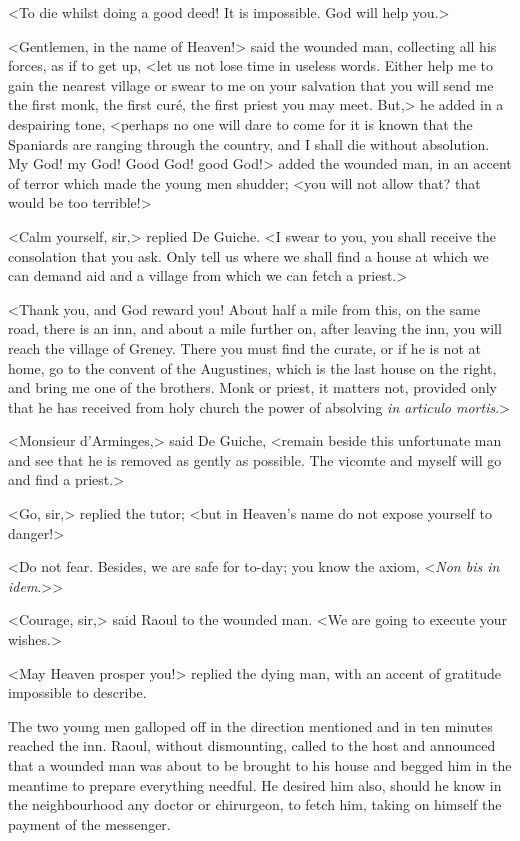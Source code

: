 <To die whilst doing a good deed! It is impossible. God will help you.>

<Gentlemen, in the name of Heaven!> said the wounded man, collecting all his forces, as if to get up, <let us not lose time in useless words. Either help me to gain the nearest village or swear to me on your salvation that you will send me the first monk, the first curé, the first priest you may meet. But,> he added in a despairing tone, <perhaps no one will dare to come for it is known that the Spaniards are ranging through the country, and I shall die without absolution. My God! my God! Good God! good God!> added the wounded man, in an accent of terror which made the young men shudder; <you will not allow that? that would be too terrible!>

<Calm yourself, sir,> replied De Guiche. <I swear to you, you shall receive the consolation that you ask. Only tell us where we shall find a house at which we can demand aid and a village from which we can fetch a priest.>

<Thank you, and God reward you! About half a mile from this, on the same road, there is an inn, and about a mile further on, after leaving the inn, you will reach the village of Greney. There you must find the curate, or if he is not at home, go to the convent of the Augustines, which is the last house on the right, and bring me one of the brothers. Monk or priest, it matters not, provided only that he has received from holy church the power of absolving \textit{in articulo mortis}.>

<Monsieur d'Arminges,> said De Guiche, <remain beside this unfortunate man and see that he is removed as gently as possible. The vicomte and myself will go and find a priest.>

<Go, sir,> replied the tutor; <but in Heaven's name do not expose yourself to danger!>

<Do not fear. Besides, we are safe for to-day; you know the axiom, <\textit{Non bis in idem}.>>

<Courage, sir,> said Raoul to the wounded man. <We are going to execute your wishes.>

<May Heaven prosper you!> replied the dying man, with an accent of gratitude impossible to describe.

The two young men galloped off in the direction mentioned and in ten minutes reached the inn. Raoul, without dismounting, called to the host and announced that a wounded man was about to be brought to his house and begged him in the meantime to prepare everything needful. He desired him also, should he know in the neighbourhood any doctor or chirurgeon, to fetch him, taking on himself the payment of the messenger.

